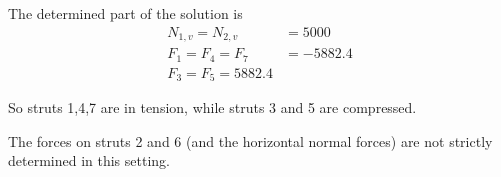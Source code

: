 \begin{applicationActivities}{2}{4}
\begin{observation}
The determined part of the solution is
\begin{align*}
N_{1,v}=N_{2,v}&=5000 \\
F_1=F_4=F_7&=-5882.4 \\
F_3=F_5=5882.4
\end{align*}

So struts 1,4,7 are in tension, while struts 3 and 5 are compressed.

The forces on struts 2 and 6 (and the horizontal normal forces) are not strictly determined in this setting.
\end{observation}

\end{applicationActivities}
